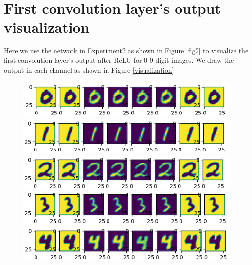 \documentclass{elegantbook}
\begin{document}
\section{First convolution layer's output visualization}
Here we use the network in Experiment2 as shown in Figure \ref{fig2} to visualize the first convolution layer's output after ReLU for 0-9 digit images. We draw the output in each channel as shown in Figure \ref{visualization}

\begin{figure}[!h]
	\centering
	\begin{minipage}[t]{0.98\textwidth}
		\centering
		\includegraphics[width=\textwidth]{../results/00}
	\end{minipage}
	\begin{minipage}[t]{0.98\textwidth}
		\centering
		\includegraphics[width=\textwidth]{../results/01}
	\end{minipage}
	\begin{minipage}[t]{0.98\textwidth}
		\centering
		\includegraphics[width=\textwidth]{../results/02}
	\end{minipage}
	\begin{minipage}[t]{0.98\textwidth}
		\centering
		\includegraphics[width=\textwidth]{../results/03}
	\end{minipage}
	\begin{minipage}[t]{0.98\textwidth}
		\centering
		\includegraphics[width=\textwidth]{../results/04}

\end{minipage}
\end{figure}
\end{document}
